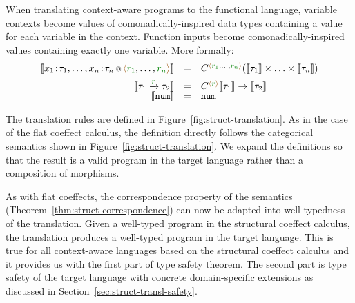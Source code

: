 When translating context-aware programs to the functional language, variable contexts become
values of comonadically-inspired data types containing a value for each variable in the context.
Function inputs become comonadically-inspired values containing exactly one variable. More formally:
%
\begin{equation*}
\begin{array}{rcl}
\sem{\coctx{x_1\!:\!\tau_1, \ldots, x_n\!:\!\tau_n}{\alift{\cclrd{r_1}, \ldots, \cclrd{r_n}}}} &=&
  \ctyp{\alift{\cclrd{r_1}, \ldots, \cclrd{r_n}}}{(\sem{\tau_1} \times \ldots \times \sem{\tau_n})} \\[0.5em]
\sem{\tau_1 \xrightarrow{\cclrd{r}} \tau_2} & = & \ctyp{\alift{\cclrd{r}}}{\sem{\tau_1}} \rightarrow \sem{\tau_2} \\[-0.2em]
\sem{\ident{num}} & = & \ident{num} \\
\end{array}
\end{equation*}

\noindent
The translation rules are defined in Figure~\ref{fig:struct-translation}. As in the case of the flat
coeffect calculus, the definition directly follows the categorical semantics shown in
Figure~\ref{fig:struct-translation}. We expand the definitions so that the result is a valid
program in the target language rather than a composition of morphisms.

As with flat coeffects, the correspondence property of the semantics (Theorem~\ref{thm:struct-correspondence})
can now be adapted into well-typedness of the translation. Given a well-typed program in the
structural coeffect calculus, the translation produces a well-typed program in the target
language. This is true for all context-aware languages based on the structural coeffect calculus
and it provides us with the first part of type safety theorem. The second part is type safety
of the target language with concrete domain-specific extensions as discussed in
Section~\ref{sec:struct-transl-safety}.

